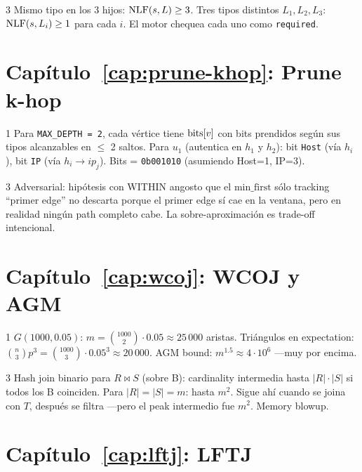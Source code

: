 \begin{solucion}{3}
Mismo tipo en los 3 hijos: \(\mathrm{NLF}(s, L) \geq 3\). Tres tipos
distintos \(L_1, L_2, L_3\): \(\mathrm{NLF}(s, L_i) \geq 1\) para cada
\(i\). El motor chequea cada uno como \texttt{required}.
\end{solucion}

\section*{Capítulo~\ref{cap:prune-khop}: Prune k-hop}

\begin{solucion}{1}
Para \texttt{MAX\_DEPTH = 2}, cada vértice tiene
\(\mathrm{bits}[v]\) con bits prendidos según sus tipos alcanzables en
$\leq$ 2 saltos. Para \(u_1\) (autentica en \(h_1\) y \(h_2\)):
bit \texttt{Host} (vía \(h_i\)), bit \texttt{IP} (vía \(h_i \to
ip_j\)). Bits = \texttt{0b001010} (asumiendo Host=1, IP=3).
\end{solucion}

\begin{solucion}{3}
Adversarial: hipótesis con WITHIN angosto que el
\(\mathrm{min\_first}\) sólo tracking ``primer edge'' no descarta
porque el primer edge sí cae en la ventana, pero en realidad
ningún path completo cabe. La sobre-aproximación es trade-off
intencional.
\end{solucion}

\section*{Capítulo~\ref{cap:wcoj}: WCOJ y AGM}

\begin{solucion}{1}
\(G(1000, 0.05)\): \(m = \binom{1000}{2} \cdot 0.05 \approx
25\,000\) aristas. Triángulos en expectation: \(\binom{n}{3}
p^3 = \binom{1000}{3} \cdot 0.05^3 \approx 20\,000\). AGM bound:
\(m^{1.5} \approx 4 \cdot 10^6\) ---muy por encima.
\end{solucion}

\begin{solucion}{3}
Hash join binario para \(R \bowtie S\) (sobre B): cardinality
intermedia hasta \(|R| \cdot |S|\) si todos los B coinciden. Para
\(|R| = |S| = m\): hasta \(m^2\). Sigue ahí cuando se joina con
\(T\), después se filtra ---pero el peak intermedio fue
\(m^2\). Memory blowup.
\end{solucion}

\section*{Capítulo~\ref{cap:lftj}: LFTJ}

